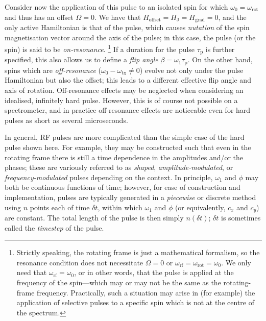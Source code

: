 Consider now the application of this pulse to an isolated spin for which $\omega_0 = \omega_\text{rot}$ and thus has an offset $\Omega = 0$.
We have that $H_\text{offset} = H_\text{J} = H_\text{grad} = 0$, and the only active Hamiltonian is that of the pulse, which causes \textit{nutation} of the spin magnetisation vector around the axis of the pulse; in this case, the pulse (or the spin) is said to be \textit{on-resonance}.%
\footnote{Strictly speaking, the rotating frame is just a mathematical formalism, so the resonance condition does not necessitate $\Omega = 0$ or $\omega_\text{rf} = \omega_\text{rot} = \omega_0$. We only need that $\omega_\text{rf} = \omega_0$, or in other words, that the pulse is applied at the frequency of the spin---which may or may not be the same as the rotating-frame frequency. Practically, such a situation may arise in (for example) the application of selective pulses to a specific spin which is not at the centre of the spectrum.}
If a duration for the pulse $\tau_\text{p}$ is further specified, this also allows us to define a \textit{flip angle} $\beta = \omega_1 \tau_\text{p}$.
On the other hand, spins which are \textit{off-resonance} ($\omega_0 - \omega_\text{tx} \neq 0$) evolve not only under the pulse Hamiltonian but also the offset; this leads to a different effective flip angle and axis of rotation.
Off-resonance effects may be neglected when considering an idealised, infinitely hard pulse.
However, this is of course not possible on a spectrometer, and in practice off-resonance effects are noticeable even for hard pulses as short as several microseconds.

In general, RF pulses are more complicated than the simple case of the hard pulse shown here.
For example, they may be constructed such that even in the rotating frame there is still a time dependence in the amplitudes and/or the phases; these are variously referred to as \textit{shaped}, \textit{amplitude-modulated}, or \textit{frequency-modulated} pulses depending on the context.
In principle, $\omega_1$ and $\phi$ may both be continuous functions of time; however, for ease of construction and implementation, pulses are typically generated in a \textit{piecewise} or discrete method using $n$ points each of time $\delta t$, within which $\omega_1$ and $\phi$  (or equivalently, $c_x$ and $c_y$) are constant.
The total length of the pulse is then simply $n(\delta t)$; $\delta t$ is sometimes called the \textit{timestep} of the pulse.
